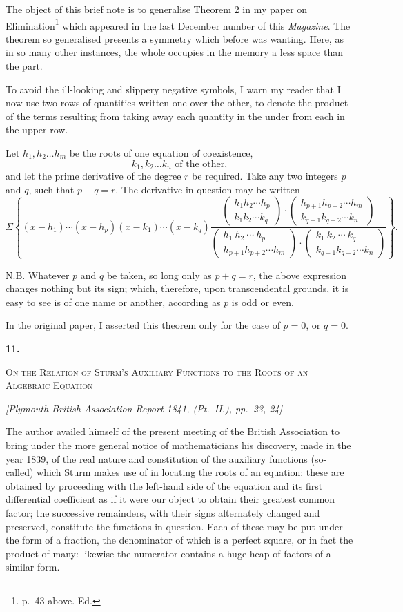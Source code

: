 \documentclass[11pt]{article}
\newcommand{\paperhead}[3]{%
  \clearpage
  \begin{center}
  {\Large\bfseries #1.}\par\vspace{0.85em}
  {\large\scshape #2}\par\vspace{0.6em}
  {\itshape [#3]}\par
  \end{center}\vspace{0.4em}}
\newcommand{\sourcepage}[1]{\marginpar{\scriptsize p.~#1}}
\newcommand{\rowparen}[2]{\left(\begin{matrix}#1\\#2\end{matrix}\right)}
\begin{document}
\sourcepage{58}
The object of this brief note is to generalise Theorem 2 in my paper on Elimination\footnote{p.~43 above. Ed.} which appeared in the last December number of this \emph{Magazine}. The theorem so generalised presents a symmetry which before was wanting. Here, as in so many other instances, the whole occupies in the memory a less space than the part.

To avoid the ill-looking and slippery negative symbols, I warn my reader that I now use two rows of quantities written one over the other, to denote the product of the terms resulting from taking away each quantity in the under from each in the upper row.

Let $h_1,h_2\ldots h_m$ be the roots of one equation of coexistence,
\[
 k_1,k_2\ldots k_n \text{ of the other,}
\]
and let the prime derivative of the degree $r$ be required. Take any two integers $p$ and $q$, such that $p+q=r$. The derivative in question may be written
\[
\Sigma\left\{(x-h_1)\cdots(x-h_p)(x-k_1)\cdots(x-k_q)
\frac{
\rowparen{h_1h_2\cdots h_p}{k_1k_2\cdots k_q}\cdot
\rowparen{h_{p+1}h_{p+2}\cdots h_m}{k_{q+1}k_{q+2}\cdots k_n}}
{\rowparen{h_1\ h_2\ \cdots\ h_p}{h_{p+1}h_{p+2}\cdots h_m}\cdot
\rowparen{k_1\ k_2\ \cdots\ k_q}{k_{q+1}k_{q+2}\cdots k_n}}
\right\}.
\]

N.B. Whatever $p$ and $q$ be taken, so long only as $p+q=r$, the above expression changes nothing but its sign; which, therefore, upon transcendental grounds, it is easy to see is of one name or another, according as $p$ is odd or even.

In the original paper, I asserted this theorem only for the case of $p=0$, or $q=0$.

\paperhead{11}{On the Relation of Sturm's Auxiliary Functions to the Roots of an Algebraic Equation}{Plymouth British Association Report 1841, (Pt.~II.), pp.~23, 24}

\sourcepage{59}
The author availed himself of the present meeting of the British Association to bring under the more general notice of mathematicians his discovery, made in the year 1839, of the real nature and constitution of the auxiliary functions (so-called) which Sturm makes use of in locating the roots of an equation: these are obtained by proceeding with the left-hand side of the equation and its first differential coefficient as if it were our object to obtain their greatest common factor; the successive remainders, with their signs alternately changed and preserved, constitute the functions in question. Each of these may be put under the form of a fraction, the denominator of which is a perfect square, or in fact the product of many: likewise the numerator contains a huge heap of factors of a similar form.
\end{document}
